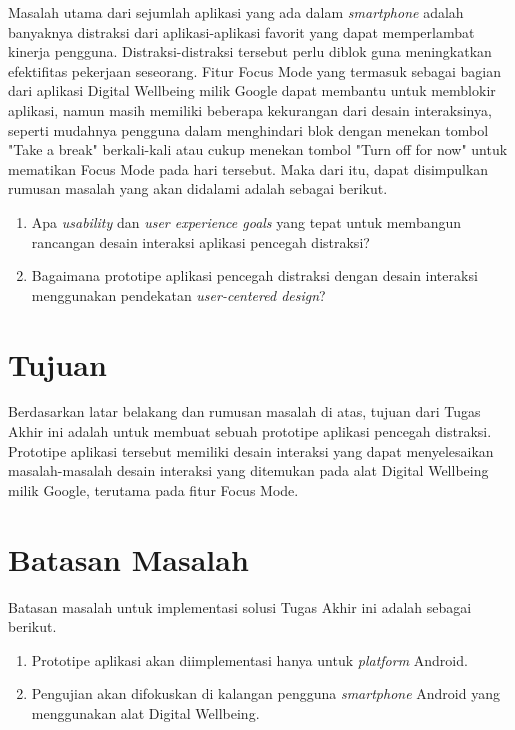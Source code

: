 Masalah utama dari sejumlah aplikasi yang ada dalam \emph{smartphone} adalah banyaknya distraksi dari aplikasi-aplikasi favorit yang dapat memperlambat kinerja pengguna. Distraksi-distraksi tersebut perlu diblok guna meningkatkan efektifitas pekerjaan seseorang. Fitur Focus Mode yang termasuk sebagai bagian dari aplikasi Digital Wellbeing milik Google dapat membantu untuk memblokir aplikasi, namun masih memiliki beberapa kekurangan dari desain interaksinya, seperti mudahnya pengguna dalam menghindari blok dengan menekan tombol "Take a break" berkali-kali atau cukup menekan tombol "Turn off for now" untuk mematikan Focus Mode pada hari tersebut. Maka dari itu, dapat disimpulkan rumusan masalah yang akan didalami adalah sebagai berikut.

\begin{enumerate}
  \item Apa \emph{usability} dan \emph{user experience goals} yang tepat untuk membangun rancangan desain interaksi aplikasi pencegah distraksi?
  \item Bagaimana prototipe aplikasi pencegah distraksi dengan desain interaksi menggunakan pendekatan \emph{user-centered design}?
\end{enumerate}

\section{Tujuan}

Berdasarkan latar belakang dan rumusan masalah di atas, tujuan dari Tugas Akhir ini adalah untuk membuat sebuah prototipe aplikasi pencegah distraksi. Prototipe aplikasi tersebut memiliki desain interaksi yang dapat menyelesaikan masalah-masalah desain interaksi yang ditemukan pada alat Digital Wellbeing milik Google, terutama pada fitur Focus Mode.

\section{Batasan Masalah}

Batasan masalah untuk implementasi solusi Tugas Akhir ini adalah sebagai berikut.
\begin{enumerate}
  \item Prototipe aplikasi akan diimplementasi hanya untuk \textit{platform} Android.
  \item Pengujian akan difokuskan di kalangan pengguna \textit{smartphone} Android yang menggunakan alat Digital Wellbeing.
\end{enumerate}

